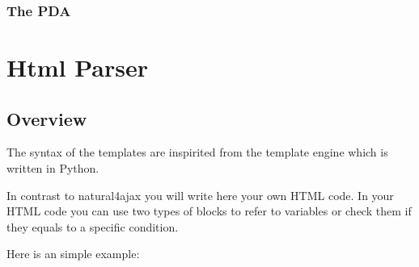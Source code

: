 \documentclass[letterpaper,10pt,english]{sphinxmanual}
\begin{document}
\subsubsection{The PDA}
\label{\detokenize{natural:the-pda}}
\begin{sphinxVerbatim}[commandchars=\\\{\}]
  
     
     
     
     
     
     
      
\end{sphinxVerbatim}


\section{Html Parser}
\label{\detokenize{html-parser::doc}}\label{\detokenize{html-parser:html-parser}}

\subsection{Overview}
\label{\detokenize{html-parser:overview}}\label{\detokenize{html-parser:template-example}}
The syntax of the templates are inspirited from the template engine  which is written in Python.

In contrast to natural4ajax you will write here your own HTML code. In your HTML code you can use two types of blocks to refer to variables or check them if they equals to a specific condition.

Here is an simple example:
\end{document}

